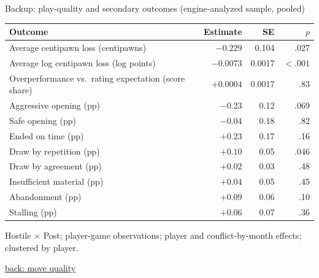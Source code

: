 \documentclass[aspectratio=169,11pt,t]{beamer}
\newcommand{\backto}[2]{\vfill\hfill\hyperlink{#1}{\textcolor{linkblue}{\scriptsize\textsf{back: #2}}}}
\begin{document}
\begin{frame}[label=bk-secondary]{Backup: play-quality and secondary outcomes (engine-analyzed sample, pooled)}
  \centering
  \footnotesize
  \begin{tabular}{@{}lrrr@{}}
    \toprule
    Outcome & Estimate & SE & $p$ \\
    \midrule
    Average centipawn loss (centipawns) & $-0.229$ & 0.104 & .027 \\
    Average log centipawn loss (log points) & $-0.0073$ & 0.0017 & $< .001$ \\
    Overperformance vs.\ rating expectation (score share) & $+0.0004$ & 0.0017 & .83 \\
    \midrule
    Aggressive opening (pp) & $-0.23$ & 0.12 & .069 \\
    Safe opening (pp) & $-0.04$ & 0.18 & .82 \\
    Ended on time (pp) & $+0.23$ & 0.17 & .16 \\
    Draw by repetition (pp) & $+0.10$ & 0.05 & .046 \\
    Draw by agreement (pp) & $+0.02$ & 0.03 & .48 \\
    Insufficient material (pp) & $+0.04$ & 0.05 & .45 \\
    Abandonment (pp) & $+0.09$ & 0.06 & .10 \\
    Stalling (pp) & $+0.06$ & 0.07 & .36 \\
    \bottomrule
  \end{tabular}
  \begin{flushleft}\footnotesize
    Hostile $\times$ Post; player-game observations; player and conflict-by-month effects; clustered by player.
  \end{flushleft}
  \backto{quality}{move quality}
\end{frame}
\end{document}
